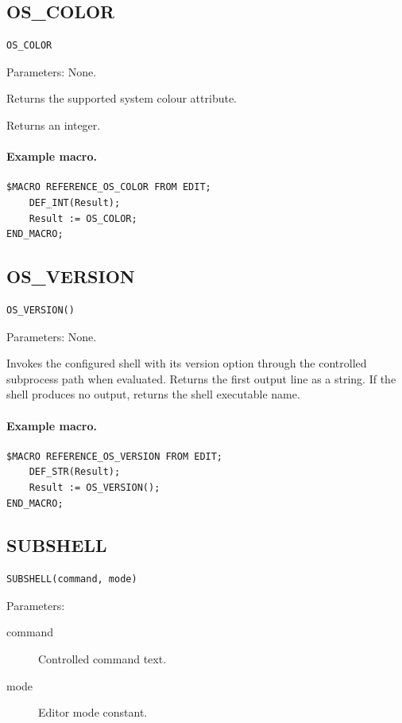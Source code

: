\documentclass[a4paper,10pt,twoside,openany]{book}
\newenvironment{mrmacextension}{\begin{changebar}}{\end{changebar}}
\begin{document}
\subsection*{OS\_COLOR}
\begin{verbatim}
OS_COLOR
\end{verbatim}
Parameters: None.

Returns the supported system colour attribute.

Returns an integer.

\paragraph{Example macro.}
\begin{verbatim}
$MACRO REFERENCE_OS_COLOR FROM EDIT;
    DEF_INT(Result);
    Result := OS_COLOR;
END_MACRO;
\end{verbatim}

\begin{mrmacextension}
\label{prim:intrinsic-os-version}
\subsection*{OS\_VERSION}
\begin{verbatim}
OS_VERSION()
\end{verbatim}
Parameters: None.

Invokes the configured shell with its version option through the controlled
subprocess path when evaluated. Returns the first output line as a string. If
the shell produces no output, returns the shell executable name.

\paragraph{Example macro.}
\begin{verbatim}
$MACRO REFERENCE_OS_VERSION FROM EDIT;
    DEF_STR(Result);
    Result := OS_VERSION();
END_MACRO;
\end{verbatim}
\end{mrmacextension}

\label{prim:intrinsic-subshell}
\subsection*{SUBSHELL}
\begin{verbatim}
SUBSHELL(command, mode)
\end{verbatim}
Parameters:
\begin{description}
\item[command] Controlled command text.
\item[mode] Editor mode constant.
\end{description}
\end{document}
